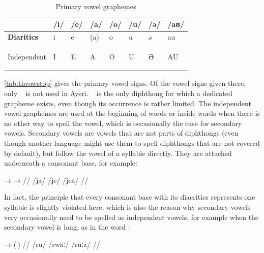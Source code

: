 \begin{table}
\caption{Primary vowel graphemes}

\begin{tabu} to 
\toprule
\tableheaderfont

	& /i/
	& /e/
	& /a/
	& /o/
	& /u/
	& /ə/
	& /aʊ/
	\\
	
\toprule
	
Diaritics
	& \Tagati\huge *i
	& \Tagati\huge *e
	& \huge ({\Tagati *a})
	& \Tagati\huge *o
	& \Tagati\huge *u
	& \Tagati\huge *ə
	& \Tagati\huge *au
	\\

\midrule

Independent
	& \Tagati\huge I
	& \Tagati\huge E
	& \Tagati\huge A
	& \Tagati\huge O
	& \Tagati\huge U
	& \Tagati\huge Ə
	& \Tagati\huge AU
	\\

\bottomrule
\end{tabu}
\label{tab:thvowstop}
\end{table}

\autoref{tab:thvowstop} gives the primary vowel signs. Of the vowel signs given
there, only ~ is not used in Ayeri. ~ is the
only diphthong for which a dedicated grapheme exists, even though its
occurrence is rather limited. The independent vowel graphemes are used at the
beginning of words or inside words when there is no other way to spell the
vowel, which is occasionally the case for secondary vowels. Secondary vowels
are vowels that are not parts of diphthongs (even though another language might
use them to spell diphthongs that are not covered by default), but follow the
vowel of a syllable directly. They are attached underneath a consonant base,
for example:

\ex[lingstyle=thex]\begingl
	\gla {}	→		→	 //
	\glb /ja/	{}	/je/		{}	/jea/ //
\endgl\xe

In fact, the principle that every consonant base with its diacritics represents
one syllable is slightly violated here, which is also the reason why secondary 
vowels very occasionally need to be spelled as independent vowels, for example 
when the secondary vowel is long, as in the word :

\ex[lingstyle=thex]\label{ex:rwaa}\begingl
	\gla {}	→		\quad	(\,) //
	\glb /ru/	{}	/rwaː/ 		\quad	\excl{}/ruːa/ //
\endgl\xe

